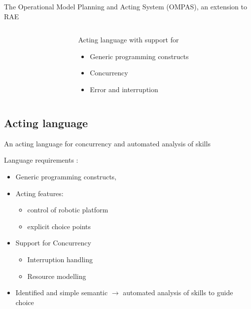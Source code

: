 \begin{frame}{The Operational Model Planning and Acting System (OMPAS), an extension to RAE}
\begin{columns}[t]
\begin{column}{0.5\textwidth}
        \end{column}
        \begin{column}{0.5\textwidth}
        Acting language with support for
        \begin{itemize}
            \item Generic programming constructs
            \item Concurrency
            \item Error and interruption
        \end{itemize}
        \end{column}
    \end{columns}
\end{frame}

\subsection{Acting language}

\begin{frame}[fragile]{An acting language for concurrency and automated analysis of skills}
    
    Language requirements :
    \begin{itemize}
        \item Generic programming constructs,
        \item Acting features:
        \begin{itemize}
            \item control of robotic platform
            \item explicit choice points
        \end{itemize}
        \item Support for Concurrency
        \begin{itemize}
            \item Interruption handling
            \item Resource modelling
        \end{itemize}
        \item Identified and simple semantic $\rightarrow$ automated analysis of skills to guide choice
    \end{itemize}

\end{frame}

